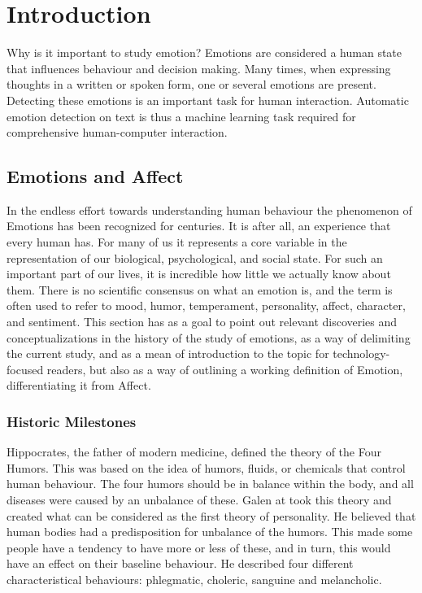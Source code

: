 \chapter{Introduction}\label{chap:Introduction}

Why is it important to study emotion?
Emotions are considered a human state that influences behaviour and decision making. Many times, when expressing thoughts in a written or spoken form, one or several emotions are present. Detecting these emotions is an important task for human interaction. Automatic emotion detection on text is thus a machine learning task required for comprehensive human-computer interaction.

\section{Emotions and Affect}\label{sec:Emotions and Affect}

In the endless effort towards understanding human behaviour the phenomenon of Emotions has been recognized for centuries. It is after all, an experience that every human has. For many of us it represents a core variable in the representation of our biological, psychological, and social state. For such an important part of our lives, it is incredible how little we actually know about them. There is no scientific consensus on what an emotion is, and the term is often used to refer to mood, humor, temperament, personality, affect, character, and sentiment.
This section has as a goal to point out relevant discoveries and conceptualizations in the history of the study of emotions, as a way of delimiting the current study, and as a mean of introduction to the topic for technology-focused readers, but also as a way of outlining a working definition of Emotion, differentiating it from Affect.

\subsection{Historic Milestones}\label{sub:Historic Milestones}

Hippocrates, the father of modern medicine, defined the theory of the Four Humors.
This was based on the idea of humors, fluids, or chemicals that control human behaviour.
The four humors should be in balance within the body, and all diseases were caused by an unbalance of these.\cite{kalachanis2015hippocrates}
Galen at took this theory and created what can be considered as the first theory of personality. He believed that human bodies had a predisposition for unbalance of the humors. This made some people have a tendency to have more or less of these, and in turn, this would have an effect on their baseline behaviour. He described four different characteristical behaviours: phlegmatic, choleric, sanguine and melancholic.\cite{irwin1947galen}

